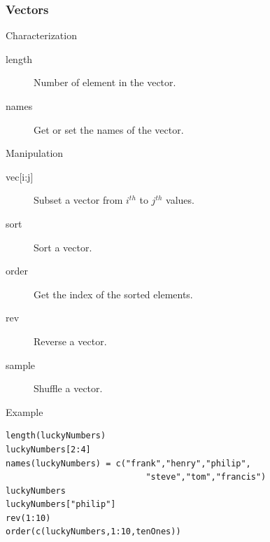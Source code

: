 \documentclass[10pt]{beamer}
\newenvironment{xframe}[2][]
  {\begin{frame}[fragile,environment=xframe,#1]
  \frametitle{#2}}
  {\end{frame}}
\begin{document}

\begin{xframe}[shrink=5]{Vectors}
  \begin{block}{Characterization}
    \begin{description}
    \item[length] Number of element in the vector.
    \item[names] Get or set the names of the vector.
    \end{description}
  \end{block}
  \begin{block}{Manipulation}
    \begin{description}
    \item[{vec[i:j]} ]Subset a vector from $i^{th}$ to $j^{th}$ values.
    \item[sort] Sort a vector.
    \item[order] Get the index of the sorted elements.
    \item[rev] Reverse a vector.
    \item[sample] Shuffle a vector.
    \end{description}
  \end{block}
  \begin{exampleblock}{Example}
\begin{verbatim}
length(luckyNumbers)
luckyNumbers[2:4]
names(luckyNumbers) = c("frank","henry","philip",
                            "steve","tom","francis") 
luckyNumbers
luckyNumbers["philip"]
rev(1:10)
order(c(luckyNumbers,1:10,tenOnes))
\end{verbatim}
  \end{exampleblock}
\end{xframe}

\end{document}
